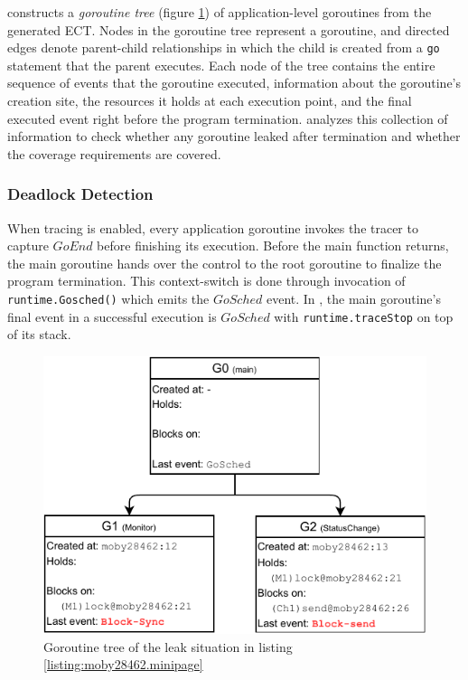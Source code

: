\goat constructs a \textit{goroutine tree} (figure \ref{fig:gtree}) of application-level goroutines from the generated ECT.
%
Nodes in the goroutine tree represent a goroutine, and directed edges denote parent-child relationships in which the child is created from a \texttt{go} statement that the parent executes.
%
Each node of the tree contains the entire sequence of events that the goroutine executed, information about the goroutine's creation site, the resources it holds at each execution point, and the final executed event right before the program termination.
%
\goat analyzes this collection of information to check whether any goroutine leaked after termination and whether the coverage requirements are covered.

\subsubsection{Deadlock Detection}
When tracing is enabled, every application goroutine invokes the tracer to capture $GoEnd$ before finishing its execution.
%
Before the main function returns, the main goroutine hands over the control to the root goroutine to finalize the program termination.
%
This context-switch is done through invocation of \texttt{runtime.Gosched()} which emits the $GoSched$ event.
%
In \goat, the main goroutine's final event in a successful execution is $GoSched$ with \texttt{runtime.traceStop} on top of its stack.

\begin{figure}[]
\centering
\includegraphics[width=0.75\linewidth]{figs/gtree.pdf}
\caption{Goroutine tree of the leak situation in listing \ref{listing:moby28462.minipage}}
\label{fig:gtree}
\end{figure}

